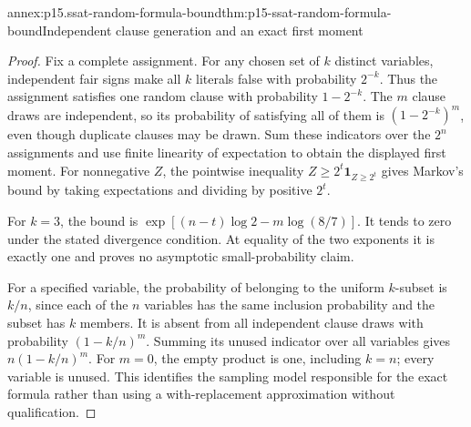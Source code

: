 \begin{annexitem}{annex:p15.ssat-random-formula-bound}{thm:p15-ssat-random-formula-bound}{Independent clause generation and an exact first moment}
\begin{proof}
Fix a complete assignment. For any chosen set of \(k\) distinct
variables, independent fair signs make all \(k\) literals false
with probability \(2^{-k}\). Thus the assignment satisfies one
random clause with probability \(1-2^{-k}\). The \(m\)
clause draws are independent, so its probability of satisfying all
of them is \((1-2^{-k})^m\), even though duplicate clauses may
be drawn. Sum these indicators over the \(2^n\) assignments and
use finite linearity of expectation to obtain the displayed first
moment. For nonnegative \(Z\), the pointwise inequality
\(Z\geq2^t\mathbf1_{Z\geq2^t}\) gives Markov's bound by
taking expectations and dividing by positive \(2^t\).

For \(k=3\), the bound is
\(\exp[(n-t)\log2-m\log(8/7)]\). It tends to zero under
the stated divergence condition. At equality of the two exponents
it is exactly one and proves no asymptotic small-probability claim.

For a specified variable, the probability of belonging to the uniform
\(k\)-subset is \(k/n\), since each of the \(n\) variables
has the same inclusion probability and the subset has \(k\) members.
It is absent from all independent clause draws with probability
\((1-k/n)^m\). Summing its unused indicator over all variables
gives \(n(1-k/n)^m\). For \(m=0\), the empty product is one,
including \(k=n\); every variable is unused. This identifies the
sampling model responsible for the exact formula rather than using
a with-replacement approximation without qualification.
\end{proof}
\end{annexitem}
